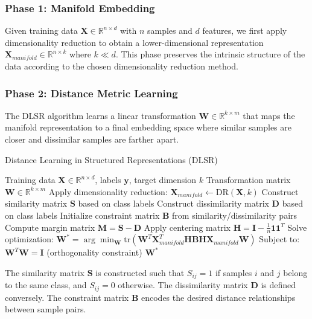 \documentclass[review]{elsarticle}
\begin{document}
\subsubsection{Phase 1: Manifold Embedding}

Given training data $\mathbf{X} \in \mathbb{R}^{n \times d}$ with $n$ samples and $d$ features, we first apply dimensionality reduction to obtain a lower-dimensional representation $\mathbf{X}_{manifold} \in \mathbb{R}^{n \times k}$ where $k \ll d$. This phase preserves the intrinsic structure of the data according to the chosen dimensionality reduction method.

\subsubsection{Phase 2: Distance Metric Learning}

The DLSR algorithm learns a linear transformation $\mathbf{W} \in \mathbb{R}^{k \times m}$ that maps the manifold representation to a final embedding space where similar samples are closer and dissimilar samples are farther apart.

\begin{algorithm}[H]
\caption{Distance Learning in Structured Representations (DLSR)}
\label{alg:dlsr}
\begin{algorithmic}[1]
\REQUIRE Training data $\mathbf{X} \in \mathbb{R}^{n \times d}$, labels $\mathbf{y}$, target dimension $k$
\ENSURE Transformation matrix $\mathbf{W} \in \mathbb{R}^{k \times m}$
\STATE Apply dimensionality reduction: $\mathbf{X}_{manifold} \leftarrow \text{DR}(\mathbf{X}, k)$
\STATE Construct similarity matrix $\mathbf{S}$ based on class labels
\STATE Construct dissimilarity matrix $\mathbf{D}$ based on class labels
\STATE Initialize constraint matrix $\mathbf{B}$ from similarity/dissimilarity pairs
\STATE Compute margin matrix $\mathbf{M} = \mathbf{S} - \mathbf{D}$
\STATE Apply centering matrix $\mathbf{H} = \mathbf{I} - \frac{1}{n}\mathbf{1}\mathbf{1}^T$
\STATE Solve optimization: $\mathbf{W}^* = \arg\min_{\mathbf{W}} \text{tr}(\mathbf{W}^T \mathbf{X}_{manifold}^T \mathbf{H} \mathbf{B} \mathbf{H} \mathbf{X}_{manifold} \mathbf{W})$
\STATE Subject to: $\mathbf{W}^T \mathbf{W} = \mathbf{I}$ (orthogonality constraint)
\RETURN $\mathbf{W}^*$
\end{algorithmic}
\end{algorithm}

The similarity matrix $\mathbf{S}$ is constructed such that $S_{ij} = 1$ if samples $i$ and $j$ belong to the same class, and $S_{ij} = 0$ otherwise. The dissimilarity matrix $\mathbf{D}$ is defined conversely. The constraint matrix $\mathbf{B}$ encodes the desired distance relationships between sample pairs.
\end{document}
